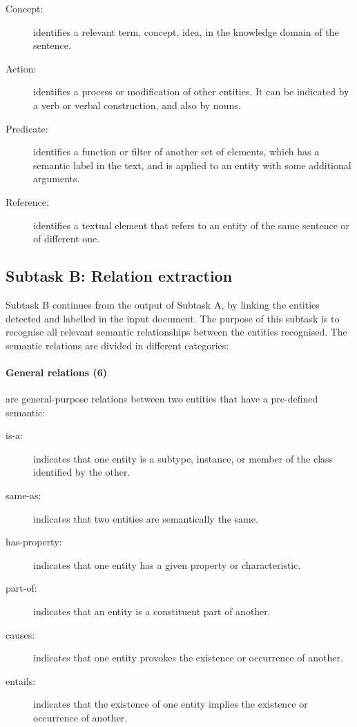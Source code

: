 \documentclass[a4paper,11pt,twocolumn,twoside]{article}
\begin{document}
\begin{description}
  \item[Concept:] identifies a relevant term, concept, idea, in the knowledge domain of the sentence.
  \item[Action:] identifies a process or modification of other entities. It can be indicated by a verb or verbal construction, and also by nouns.
  \item[Predicate:] identifies a function or filter of another set of elements, which has a semantic label in the text, and is applied to an entity with some additional arguments.
  \item[Reference:] identifies a textual element that refers to an entity of the same sentence or of different one.
\end{description}

\subsection{Subtask B: Relation extraction}

Subtask B continues from the output of Subtask A, by linking the entities detected and labelled in the input document. The purpose of this subtask is to recognise all relevant semantic relationships between the entities recognised. The semantic relations are divided in different categories:

\paragraph{General relations (6)} are general-purpose relations between two entities that have a pre-defined semantic:

\begin{description}
  \item[is-a:] indicates that one entity is a subtype, instance, or member of the class identified by the other.
  \item[same-as:] indicates that two entities are semantically the same.
  \item[has-property:] indicates that one entity has a given property or characteristic.
  \item[part-of:] indicates that an entity is a constituent part of another.
  \item[causes:] indicates that one entity provokes the existence or occurrence of another.
  \item[entails:] indicates that the existence of one entity implies the existence or occurrence of another.
\end{description}
\end{document}
